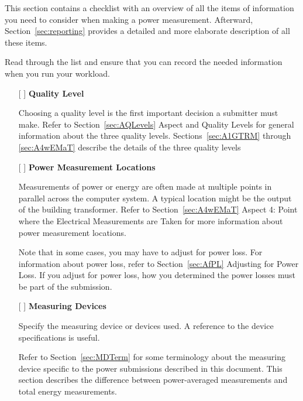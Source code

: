 \label{sec:checklist}


\noindent
This section contains a checklist with an overview of all the items of information you need to consider when making a power measurement.
Afterward, Section~\ref{sec:reporting} provides a detailed and more elaborate description of all these items.
\wl

\noindent
Read through the list and ensure that you can record the needed 
information when you run your workload.
\wl

\begin{itemize}
\item[{[ ]}]
\textbf{Quality Level}

Choosing a quality level is the first important decision a submitter must make. Refer to 
Section~\ref{sec:AQLevels} Aspect and Quality Levels for general information about the three quality levels.  
Sections~\ref{sec:A1GTRM} through \ref{sec:A4wEMaT} describe the details of the three quality levels

\item[{[ ]}]
\textbf{Power Measurement Locations}

Measurements of power or energy are often made at multiple points in parallel across the computer system. A typical location might be the output of the building transformer.
Refer to Section~\ref{sec:A4wEMaT} Aspect 4: Point where the Electrical Measurements are Taken 
for more information about power measurement locations.

Note that in some cases, you may have to adjust for power loss. For information about power loss, refer to 
Section~\ref{sec:AfPL} Adjusting for Power Loss.  If you adjust for power loss, how you determined the power losses must be part of the submission.


\newpage

\item[{[ ]}]
\textbf{Measuring Devices}

Specify the measuring device or devices used. A reference to the device specifications is useful.

Refer to Section~\ref{sec:MDTerm} for some terminology about the measuring device specific to the power submissions described in this document. This section describes the difference between power-averaged measurements and total energy measurements.


\end{itemize}
